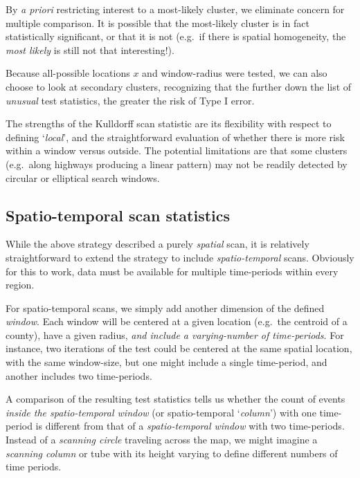 \documentclass[
]{book}
\begin{document}
By \emph{a priori} restricting interest to a most-likely cluster, we eliminate concern for multiple comparison. It is possible that the most-likely cluster is in fact statistically significant, or that it is not (e.g.~if there is spatial homogeneity, the \emph{most likely} is still not that interesting!).

Because all-possible locations \(x\) and window-radius were tested, we can also choose to look at secondary clusters, recognizing that the further down the list of \emph{unusual} test statistics, the greater the risk of Type I error.

The strengths of the Kulldorff scan statistic are its flexibility with respect to defining `\emph{local}', and the straightforward evaluation of whether there is more risk within a window versus outside. The potential limitations are that some clusters (e.g.~along highways producing a linear pattern) may not be readily detected by circular or elliptical search windows.

\hypertarget{spatio-temporal-scan-statistics}{%
\subsection{Spatio-temporal scan statistics}\label{spatio-temporal-scan-statistics}}

While the above strategy described a purely \emph{spatial} scan, it is relatively straightforward to extend the strategy to include \emph{spatio-temporal} scans. Obviously for this to work, data must be available for multiple time-periods within every region.

For spatio-temporal scans, we simply add another dimension of the defined \emph{window}. Each window will be centered at a given location (e.g.~the centroid of a county), have a given radius, \emph{and include a varying-number of time-periods}. For instance, two iterations of the test could be centered at the same spatial location, with the same window-size, but one might include a single time-period, and another includes two time-periods.

A comparison of the resulting test statistics tells us whether the count of events \emph{inside the spatio-temporal window} (or spatio-temporal `\emph{column}') with one time-period is different from that of a \emph{spatio-temporal window} with two time-periods. Instead of a \emph{scanning circle} traveling across the map, we might imagine a \emph{scanning column} or tube with its height varying to define different numbers of time periods.
\end{document}
